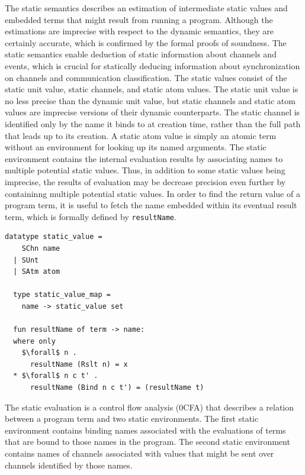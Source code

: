 \documentclass[letterpaper, 11pt]{extarticle}
\begin{document}
The static semantics describes an estimation of intermediate static values and embedded terms
that might result from running a program.  Although the estimations are imprecise with
respect to the dynamic semantics, they are certainly accurate,
which is confirmed by the formal proofs of soundness.
The static semantics enable deduction of static information about channels and events, which is
crucial for statically deducing information about synchronization on channels and
communication classification.
The static values consist of the static unit value, static channels, and static atom
values. The static unit value is no less precise than the dynamic unit value, but
static channels and static atom values are imprecise versions of their dynamic
counterparts. The static channel is identified only by the name it binds to at creation time,
rather than the full path that leads up to its creation.  A static atom value is simply an
atomic term without an environment for looking up its named arguments.  The static
environment contains the internal evaluation results by
associating names to multiple potential static values.
Thus, in addition to some static values being imprecise,
the results of evaluation may be decrease precision even further
by containinng multiple potential static values. 
In order to find the return value of a program term, it is useful to fetch the name
embedded within its eventual result term, which is formally defined by \lstinline{resultName}.

\begin{lstlisting}[language=logic, mathescape]
  datatype static_value =
    SChn name
  | SUnt
  | SAtm atom 

  type static_value_map =
    name -> static_value set

  fun resultName of term -> name:
  where only
    $\forall$ n .
      resultName (Rslt n) = x
  * $\forall$ n c t' . 
      resultName (Bind n c t') = (resultName t)
\end{lstlisting}

The static evaluation is a control flow analysis (0CFA)
that describes a relation between a program term and two static environments.
The first static environment contains binding names associated with the
evaluations of terms that are bound to those names in the program.
The second static environment contains names of channels associated
with values that might be sent over channels identified by those names.
\end{document}
